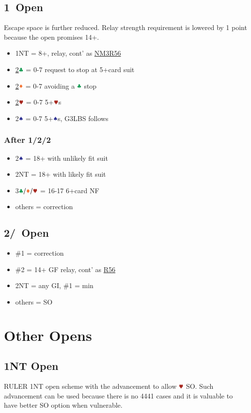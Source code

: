 \documentclass{article}
\begin{document}
\begin{multicols}{2}
\begin{CJK*}{UTF8}{gt}
\subsection{1\SSS\ Open}\label{sec:1s}
Escape space is further reduced. Relay strength requirement is lowered by 1 point because the open promises 14+.
\begin{itemize}
    \item 1NT = 8+, relay, cont' as \hyperref[sec:nlm3r56]{NM3R56}
    \item \hyperref[sec:1s-escape]{2$\ccc$} = 0-7 request to stop at 5+card suit
    \item \hyperref[sec:1s-escape]{2$\ddd$} = 0-7 avoiding a $\ccc$ stop
    \item \hyperref[sec:1s-escape]{2$\hhh$} = 0-7 5+$\hhh$s
    \item 2$\sss$ = 0-7 5+$\sss$s, G3LBS follows
\end{itemize}

\subsubsection{After 1\CCC/2\DDD/2\HHH}\label{sec:1s-escape}
\begin{itemize}
    \item 2$\sss$ = 18+ with unlikely fit suit
    \item 2NT = 18+ with likely fit suit
    \item 3$\ccc/\ddd/\hhh$ = 16-17 6+card NF
    \item others = correction
\end{itemize}

\subsection{2\CCC/\DDD\ Open}\label{sec:2cd}
\begin{itemize}
    \item \#1 = correction
    \item \#2 = 14+ GF relay, cont' as \hyperref[sec:nlm3r56]{R56}
    \item 2NT = any GI, \#1 = min
    \item others = SO
\end{itemize}

\section{Other Opens}
\subsection{1NT Open}\label{sec:1n}
RULER 1NT open scheme with the advancement to allow $\hhh$ SO. Such advancement can be used because there is no 4441 cases and it is valuable to have better SO option when vulnerable.


\end{CJK*}
\end{multicols}
\end{document}
